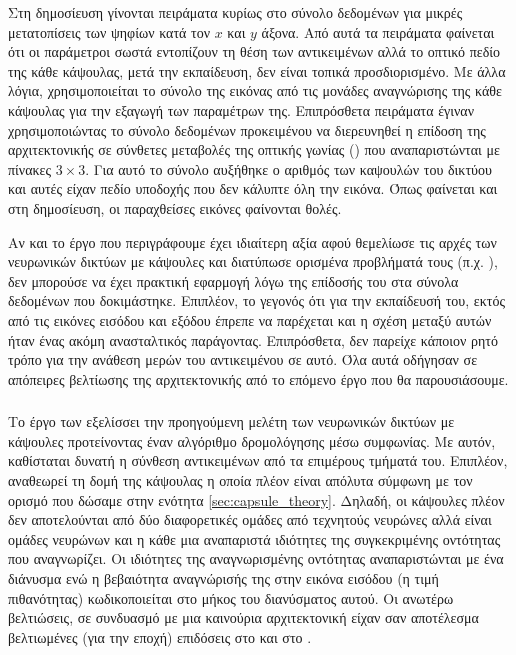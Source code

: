Στη δημοσίευση γίνονται πειράματα κυρίως στο σύνολο δεδομένων \cite{lecun1998gradientMNIST} για μικρές μετατοπίσεις των ψηφίων κατά τον $x$ και $y$ άξονα. Από αυτά τα πειράματα φαίνεται ότι οι παράμετροι σωστά εντοπίζουν τη θέση των αντικειμένων αλλά το οπτικό πεδίο της κάθε κάψουλας, μετά την εκπαίδευση, δεν είναι τοπικά προσδιορισμένο. Με άλλα λόγια, χρησιμοποιείται το σύνολο της εικόνας από τις μονάδες αναγνώρισης της κάθε κάψουλας για την εξαγωγή των παραμέτρων της. Επιπρόσθετα πειράματα έγιναν χρησιμοποιώντας το σύνολο δεδομένων \cite{lecun2004learning} προκειμένου να διερευνηθεί η επίδοση της αρχιτεκτονικής σε σύνθετες μεταβολές της οπτικής γωνίας () που αναπαριστώνται με πίνακες $3\times3$. Για αυτό το σύνολο αυξήθηκε ο αριθμός των καψουλών του δικτύου και αυτές είχαν πεδίο υποδοχής που δεν κάλυπτε όλη την εικόνα. Όπως φαίνεται και στη δημοσίευση\cite{hinton2011transforming}, οι παραχθείσες εικόνες φαίνονται θολές.\par

Αν και το έργο που περιγράφουμε έχει ιδιαίτερη αξία αφού θεμελίωσε τις αρχές των νευρωνικών δικτύων με κάψουλες και διατύπωσε ορισμένα προβλήματά τους (π.χ. ), δεν μπορούσε να έχει πρακτική εφαρμογή λόγω της επίδοσής του στα σύνολα δεδομένων που δοκιμάστηκε. Επιπλέον, το γεγονός ότι για την εκπαίδευσή του, εκτός από τις εικόνες εισόδου και εξόδου έπρεπε να παρέχεται και η σχέση μεταξύ αυτών ήταν ένας ακόμη ανασταλτικός παράγοντας. Επιπρόσθετα, δεν παρείχε κάποιον ρητό τρόπο για την ανάθεση μερών του αντικειμένου σε αυτό. Όλα αυτά οδήγησαν σε απόπειρες βελτίωσης της αρχιτεκτονικής από το επόμενο έργο που θα παρουσιάσουμε. 

\subsubsection{}

Το έργο των  \cite{sabour2017dynamic} εξελίσσει την προηγούμενη μελέτη των νευρωνικών δικτύων με κάψουλες προτείνοντας έναν αλγόριθμο δρομολόγησης μέσω συμφωνίας. Με αυτόν, καθίσταται δυνατή η σύνθεση αντικειμένων από τα επιμέρους τμήματά του. Επιπλέον, αναθεωρεί τη δομή της κάψουλας η οποία πλέον είναι απόλυτα σύμφωνη με τον ορισμό που δώσαμε στην ενότητα \ref{sec:capsule_theory}. Δηλαδή, οι κάψουλες πλέον δεν αποτελούνται από δύο διαφορετικές ομάδες από τεχνητούς νευρώνες αλλά είναι ομάδες νευρώνων και η κάθε μια αναπαριστά ιδιότητες της συγκεκριμένης οντότητας που αναγνωρίζει. Οι ιδιότητες της αναγνωρισμένης οντότητας αναπαριστώνται με ένα διάνυσμα ενώ η βεβαιότητα αναγνώρισής της στην εικόνα εισόδου (η τιμή πιθανότητας) κωδικοποιείται στο μήκος του διανύσματος αυτού. Οι ανωτέρω βελτιώσεις, σε συνδυασμό με μια καινούρια αρχιτεκτονική είχαν σαν αποτέλεσμα βελτιωμένες (για την εποχή) επιδόσεις στο \cite{lecun1998gradientMNIST} και στο \cite{sabour2017dynamic}.\par

